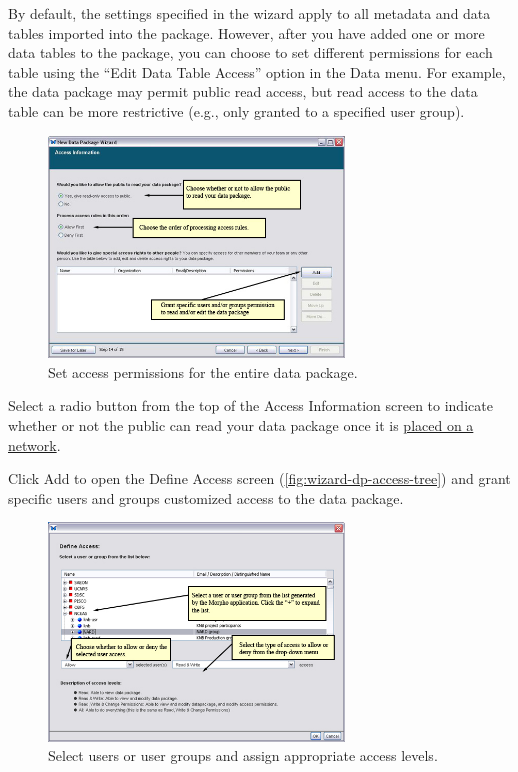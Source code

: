 By default, the settings specified in the wizard apply to all metadata
and data tables imported into the package. However, after you have added
one or more data tables to the package, you can choose to set different
permissions for each table using the ``Edit Data Table Access'' option in
the Data menu. For example, the data package may permit public read
access, but read access to the data table can be more restrictive (e.g.,
only granted to a specified user group). 

\begin{figure}
  \centering
    \includegraphics[width=0.7\textwidth]{images/wizard-dp-access.jpg}
  \caption{Set access permissions for the entire data package.}
  \label{fig:wizard-dp-access}
\end{figure}

Select a radio button from the top of the Access Information screen to
indicate whether or not the public can read your data package once it is
\hyperref[sec:uploading]{placed on a network}.

Click Add to open the Define Access screen
(\autoref{fig:wizard-dp-access-tree}) and grant specific users and
groups customized access to the data package. 

\begin{figure}
  \centering
    \includegraphics[width=0.7\textwidth]{images/wizard-dp-access-tree.jpg}
  \caption{Select users or user groups and assign appropriate access
    levels.}
  \label{fig:wizard-dp-access-tree}
\end{figure}

